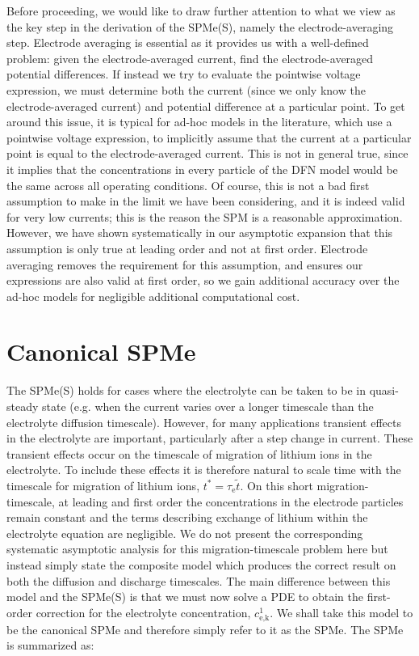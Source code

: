 \documentclass[a4paper]{article}
\newcommand{\ts}[1]{_{\text{#1}}}
\begin{document}
Before proceeding, we would like to draw further attention to what we view as the key step in the derivation of the SPMe(S), namely the electrode-averaging step. Electrode averaging is essential as it provides us with a well-defined problem: given the electrode-averaged current, find the electrode-averaged potential differences. If instead we try to evaluate the pointwise voltage expression, we must determine both the current (since we only know the electrode-averaged current) and potential difference at a particular point. To get around this issue, it is typical for ad-hoc models in the literature, which use a pointwise voltage expression, to implicitly assume that the current at a particular point is equal to the electrode-averaged current. This is not in general true, since it implies that the concentrations in every particle of the DFN model would be the same across all operating conditions. Of course, this is not a bad first assumption to make in the limit we have been considering, and it is indeed valid for very low currents; this is the reason the SPM is a reasonable approximation. However, we have shown systematically in our asymptotic expansion that this assumption is only true at leading order and not at first order. Electrode averaging removes the requirement for this assumption, and ensures our expressions are also valid at first order, so we gain additional accuracy over the ad-hoc models for negligible additional computational cost.

\section{Canonical SPMe} 
The SPMe(S) holds for cases where the electrolyte can be taken to be in quasi-steady state (e.g. when the current varies over a longer timescale than the electrolyte diffusion timescale). However, for many applications transient effects in the electrolyte are important, particularly after a step change in current. These transient effects occur on the timescale of migration of lithium ions in the electrolyte. To include these effects it is therefore natural to scale time with the timescale for migration of lithium ions, $t^*=\tau\ts{e}\tilde{t}$. On this short migration-timescale, at leading and first order the concentrations in the electrode particles remain constant and the terms describing exchange of lithium within the electrolyte equation are negligible. We do not present the corresponding systematic asymptotic analysis for this migration-timescale problem here but instead simply state the composite model which produces the correct result on both the diffusion and discharge timescales. The main difference between this model and the SPMe(S) is that we must now solve a PDE to obtain the first-order correction for the electrolyte concentration, $c\ts{e,k}^1$. We shall take this model to be the canonical SPMe and therefore simply refer to it as the SPMe. The SPMe is summarized as:
\end{document}
